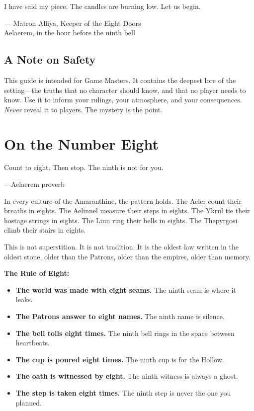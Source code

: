 \documentclass[11pt]{book}
\begin{document}
I have said my piece. The candles are burning low. Let us begin.

\begin{flushright}
--- Matron Alfiya, Keeper of the Eight Doors\\
Aelaerem, in the hour before the ninth bell
\end{flushright}

\clearpage

\section*{A Note on Safety}

This guide is intended for Game Masters. It contains the deepest lore of the setting---the truths that no character should know, and that no player needs to know. Use it to inform your rulings, your atmosphere, and your consequences. \textit{Never} reveal it to players. The mystery is the point.

\tableofcontents
\clearpage

\mainmatter


\chapter{On the Number Eight}

\epigraph{Count to eight. Then stop. The ninth is not for you.}{---Aelaerem proverb}

In every culture of the Amaranthine, the pattern holds. The Aeler count their breaths in eights. The Aelinnel measure their steps in eights. The Ykrul tie their hostage strings in eights. The Linn ring their bells in eights. The Thepyrgosi climb their stairs in eights.

This is not superstition. It is not tradition. It is the oldest law written in the oldest stone, older than the Patrons, older than the empires, older than memory.

\textbf{The Rule of Eight:}

\begin{tcolorbox}[colback=gray!5!white, colframe=wardgray!75!black, title=The Rule of Eight,breakable]
\begin{itemize}
  \item \textbf{The world was made with eight seams.} The ninth seam is where it leaks.
  \item \textbf{The Patrons answer to eight names.} The ninth name is silence.
  \item \textbf{The bell tolls eight times.} The ninth bell rings in the space between heartbeats.
  \item \textbf{The cup is poured eight times.} The ninth cup is for the Hollow.
  \item \textbf{The oath is witnessed by eight.} The ninth witness is always a ghost.
  \item \textbf{The step is taken eight times.} The ninth step is never the one you planned.
\end{itemize}
\end{tcolorbox}
\end{document}
